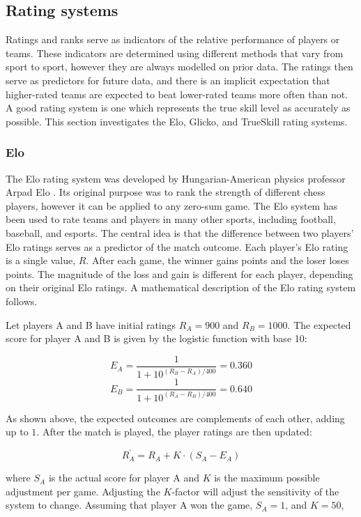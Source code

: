 \subsection{Rating systems}

Ratings and ranks serve as indicators of the relative performance of players or teams. These indicators are determined using different methods that vary from sport to sport, however they are always modelled on prior data. The ratings then serve as predictors for future data, and there is an implicit expectation that higher-rated teams are expected to beat lower-rated teams more often than not. A good rating system is one which represents the true skill level as accurately as possible. This section investigates the Elo, Glicko, and TrueSkill rating systems.

\subsubsection{Elo}
\label{elo}

The Elo rating system was developed by Hungarian-American physics professor Arpad Elo \cite{elo}. Its original purpose was to rank the strength of different chess players, however it can be applied to any zero-sum game. The Elo system has been used to rate teams and players in many other sports, including football, baseball, and esports. The central idea is that the difference between two players' Elo ratings serves as a predictor of the match outcome. Each player's Elo rating is a single value, $R$. After each game, the winner gains points and the loser loses points. The magnitude of the loss and gain is different for each player, depending on their original Elo ratings. A mathematical description of the Elo rating system follows. 

Let players A and B have initial ratings $R_A = 900$ and $R_B = 1000$. The expected score for player A and B is given by the logistic function with base 10:

\[ E_A = \frac{1}{1 + 10^{(R_B - R_A) / 400}} = 0.360 \]
\[ E_B = \frac{1}{1 + 10^{(R_A - R_B) / 400}} = 0.640 \]

As shown above, the expected outcomes are complements of each other, adding up to $1$. After the match is played, the player ratings are then updated:

\[ R_A^{'} = R_A + K \cdot (S_A - E_A) \]

where $S_A$ is the actual score for player A and $K$ is the maximum possible adjustment per game. Adjusting the $K$-factor will adjust the sensitivity of the system to change. Assuming that player A won the game, $S_A = 1$, and $K = 50$,

